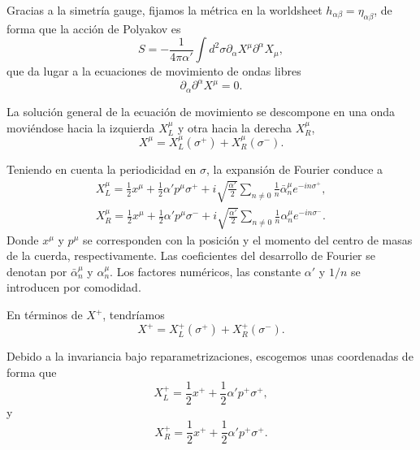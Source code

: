 Gracias a la simetría gauge, fijamos la métrica en la worldsheet $h_{\alpha\beta}=\eta_{\alpha\beta}$, de forma que 
la acción de Polyakov es
\begin{equation}
  S = -\frac{1}{4\pi\alpha'} \int d^2\sigma \partial_\alpha X^\mu \partial^\alpha X_\mu,
\end{equation}
que da lugar a la ecuaciones de movimiento de ondas libres
\begin{equation}
  \partial_\alpha \partial^\alpha X^\mu=0.
\end{equation}

La solución general de la ecuación de movimiento se descompone
en una onda moviéndose hacia la izquierda $X^\mu_L$ y otra hacia la derecha $X^\mu_R$,
\begin{equation}
   X^\mu =X^\mu_L(\sigma^+) + X^\mu_R(\sigma^-).
\end{equation}

Teniendo en cuenta la periodicidad en $\sigma$, la expansión de Fourier conduce a
\begin{equation}
  \begin{gathered}
    X^\mu_L=\frac 1 2 x^\mu + \frac 1 2 \alpha' p^\mu \sigma^+ + i\sqrt{\frac{\alpha'}{2}}\sum_{n\neq 0} \frac{1}{n}\bar \alpha^\mu_n e^{-in\sigma^+},\\
    X^\mu_R=\frac 1 2 x^\mu + \frac 1 2 \alpha' p^\mu \sigma^- +i\sqrt{\frac{\alpha'}{2}}\sum_{n\neq 0} \frac{1}{n}\alpha^\mu_n e^{-in\sigma^-}.
  \end{gathered}
\end{equation}
Donde $x^\mu$ y $p^\mu$ se corresponden con la posición y el momento del centro de masas de la cuerda, respectivamente. 
Las coeficientes del desarrollo de Fourier se denotan por $\bar \alpha^\mu_n$ y $\alpha^\mu_n$.
Los factores numéricos, las constante $\alpha'$ y $1/n$ se introducen por comodidad.

En términos de $X^+$, tendríamos
\begin{equation}
   X^+ =X^+_L(\sigma^+) + X^+_R(\sigma^-).
\end{equation}

Debido a la invariancia bajo reparametrizaciones, escogemos unas coordenadas de forma que
\begin{equation}
  X^+_L=\frac 1 2 x^+ + \frac 1 2 \alpha' p^+ \sigma^+,
\end{equation}
y
\begin{equation}
  X^+_R=\frac 1 2 x^+ + \frac 1 2 \alpha' p^+ \sigma^+.
\end{equation}

